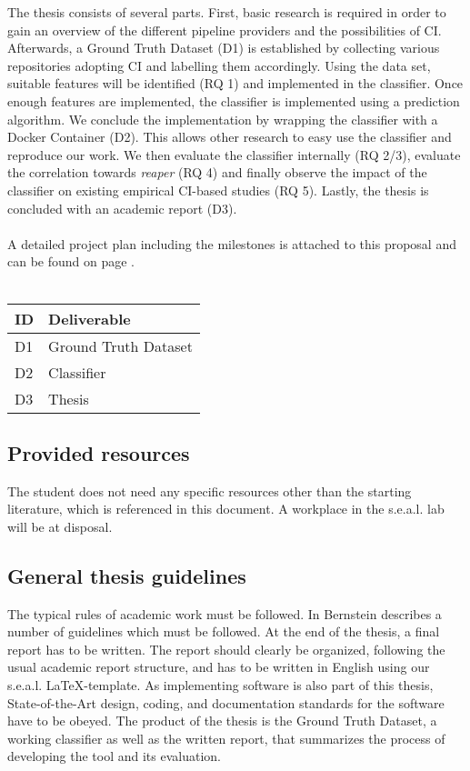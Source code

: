 \documentclass{task_description}
\begin{document}
The thesis consists of several parts. First, basic research is required in order to gain an overview of the different pipeline providers and the possibilities of CI. Afterwards, a Ground Truth Dataset (D1) is established by collecting various repositories adopting CI and labelling them accordingly. Using the data set, suitable features will be identified (RQ 1) and implemented in the classifier. Once enough features are implemented, the classifier is implemented using a prediction algorithm. We conclude the implementation by wrapping the classifier with a Docker Container (D2). This allows other research to easy use the classifier and reproduce our work. We then evaluate the classifier internally (RQ 2/3), evaluate the correlation towards \textit{reaper} (RQ 4) and finally observe the impact of the classifier on existing empirical CI-based studies (RQ 5). Lastly, the thesis is concluded with an academic report (D3).
\\\\
A detailed project plan including the milestones is attached to this proposal and can be found on page \pageref{gantt}.
\\\\
\begin{tabular}{lp{10cm}}  
 ID & Deliverable \\
\hline\noalign{\smallskip}
 D1 & Ground Truth Dataset \\
 D2 & Classifier \\
 D3 & Thesis\\
\hline
\end{tabular}

\subsection*{Provided resources}

The student does not need any specific resources other than the starting literature, which is referenced in this document. A workplace in the s.e.a.l. lab will be at disposal.

\newpage
\subsection*{General thesis guidelines}

The typical rules of academic work must be followed. In Bernstein \cite{Bernstein:8} describes a number of guidelines which must be followed. At the end of the thesis, a final report has to be written. The report should clearly be organized, following the usual academic report structure, and has to be written in English using our s.e.a.l. \LaTeX-template. As implementing software is also part of this thesis, State-of-the-Art
design, coding, and documentation standards for the software have to be obeyed. The product of the thesis is the Ground Truth Dataset, a working classifier as well as the written report, that summarizes the process of developing the tool and its evaluation.
\end{document}
